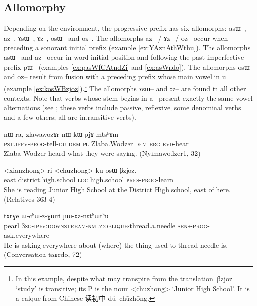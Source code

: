 \documentclass[oldfontcommands,oneside,a4paper,11pt]{article}
\newcommand{\ipa}[1]{{\phon \mbox{#1}}} %
\newcommand{\zh}[1]{{\cn #1}}
\begin{document}
\subsection{Allomorphy} \label{sec:prog.allomorphy}
Depending on the environment, the progressive prefix has six allomorphs: \ipa{asɯ--}, \ipa{az--}, \ipa{ɤsɯ--}, \ipa{ɤz--}, \ipa{osɯ--} and \ipa{oz--}. The allomorphs   \ipa{az--} / \ipa{ɤz--} / \ipa{oz--} occur when preceding a sonorant initial prefix (example \ref{ex:YAznAthWthu}). The allomorphs \ipa{asɯ--} and \ipa{az--} occur in word-initial position and following the past imperfective prefix \ipa{pɯ--} (examples \ref{ex:pasWfCAtndZi} and \ref{ex:asWndo}). The allomorphs \ipa{osɯ--} and \ipa{oz--} result from fusion with a preceding prefix whose main vowel in \ipa{u} (example \ref{ex:kosWBzjoz}).\footnote{In this example, despite what may transpire from the translation, \ipa{βzjoz} `study' is transitive; its P is the noun <chuzhong> `Junior High School'. It is a calque from Chinese \zh{读初中} \ipa{dú chūzhōng}.} The allomorphs \ipa{ɤsɯ--} and \ipa{ɤz--} are found in all other contexts. Note that verbs whose stem begins in \ipa{a--} present exactly the same vowel alternations (see \citealt{jacques07passif}; these verbs include passive, reflexive, some denominal verbs and a few others; all are intransitive verbs).


\begin{exe}
\ex \label{ex:pasWfCAtndZi}
\gll \ipa{pɯ-asɯ-fɕɤt-ndʑi} 	\ipa{nɯ} 	\ipa{ra,} 	\ipa{zlawawozɤr} 	\ipa{nɯ} 	\ipa{kɯ} 	\ipa{pjɤ-mtsʰɤm}\\
\textsc{pst.ipfv-prog}-tell-\textsc{du} \textsc{dem} \textsc{pl}  Zlaba.Wodzer \textsc{dem} \textsc{erg} \textsc{evd}-hear\\
\glt Zlaba Wodzer heard what they were saying. (Nyimawodzer1, 32)
\end{exe}

\begin{exe}
\ex \label{ex:kosWBzjoz}
\gll \ipa{akɯ} <xianzhong> \ipa{ri} <chuzhong> \ipa{ku-osɯ-βzjoz}. \\
east district.high.school \textsc{loc} high.school \textsc{pres-prog}-learn \\
\glt She is reading Junior High School at the District High school, east of here. (Relatives 363-4)
\end{exe}

 \begin{exe}
\ex \label{ex:YAznAthWthu}
\gll
\ipa{tɤrɣe}  	\ipa{ɯ-cʰɯ-z-ɣɯri}  	\ipa{ɲɯ-ɤz-nɤtʰɯtʰu}  	 \\
pearl \textsc{3sg-ipfv:downstream-nmlz:oblique}-thread.a.needle \textsc{sens-prog}-ask.everywhere \\
\glt He is asking everywhere about (where) the thing used to thread needle is. (Conversation \ipa{taʁrdo}, 72)
\end{exe}
\end{document}
